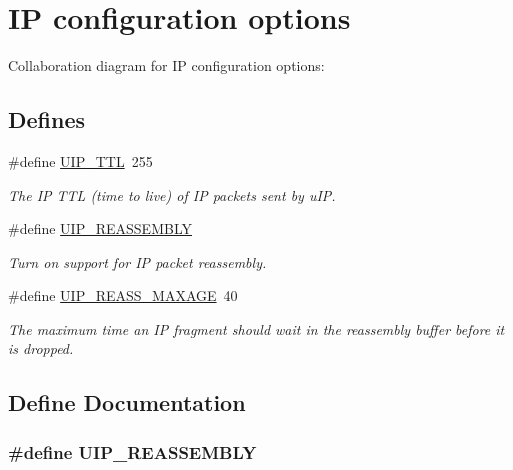 \hypertarget{a00072}{
\section{IP configuration options}
\label{a00072}
}


Collaboration diagram for IP configuration options:

\subsection*{Defines}
\begin{CompactItemize}
\item 
\#define \hyperlink{a00072_gb61381673de27f31848c5396bf0b338e}{UIP\_\-TTL}~255
\begin{CompactList}\small\item\em The IP TTL (time to live) of IP packets sent by u\-IP. \item\end{CompactList}\item 
\#define \hyperlink{a00072_gf963fdea2b75d27ef31e92d1d01359ee}{UIP\_\-REASSEMBLY}
\begin{CompactList}\small\item\em Turn on support for IP packet reassembly. \item\end{CompactList}\item 
\hypertarget{a00072_gc3882366feda1cb759ccbfe98327a7db}{
\#define \hyperlink{a00072_gc3882366feda1cb759ccbfe98327a7db}{UIP\_\-REASS\_\-MAXAGE}~40}
\label{a00072_gc3882366feda1cb759ccbfe98327a7db}

\begin{CompactList}\small\item\em The maximum time an IP fragment should wait in the reassembly buffer before it is dropped. \item\end{CompactList}\end{CompactItemize}


\subsection{Define Documentation}
\hypertarget{a00072_gf963fdea2b75d27ef31e92d1d01359ee}{
\subsubsection[UIP\_\-REASSEMBLY]{\setlength{\rightskip}{0pt plus 5cm}\#define UIP\_\-REASSEMBLY}}
\label{a00072_gf963fdea2b75d27ef31e92d1d01359ee}


